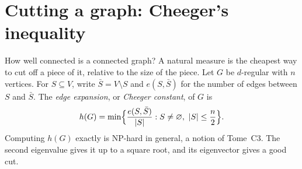 \section{Cutting a graph: Cheeger's inequality}\label{sec:cheeger}

How well connected is a connected graph? A natural measure is the cheapest way to cut off a piece of it, relative to the size of the piece. Let $G$ be $d$-regular with $n$
vertices. For $S\subseteq V$, write $\bar S=V\setminus S$ and $e(S,\bar S)$ for the number of edges between $S$ and $\bar S$. The \emph{edge expansion}, or \emph{Cheeger constant}, of $G$ is
\[
h(G)=\min\Bigl\{\frac{e(S,\bar S)}{|S|}:S\ne\varnothing,\ |S|\le\frac n2\Bigr\}.
\]
Computing $h(G)$ exactly is NP-hard in general, a notion of Tome~C3. The second eigenvalue gives it up to a square root, and its eigenvector gives a good cut.

